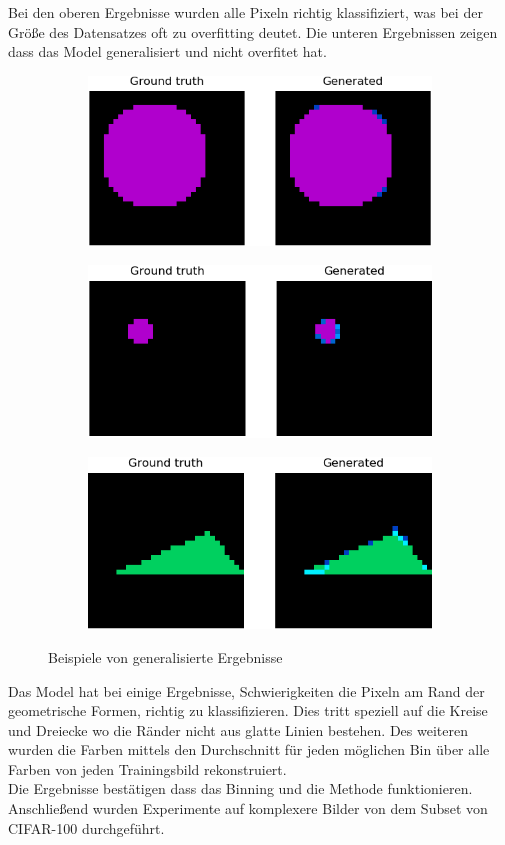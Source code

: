 Bei den oberen Ergebnisse wurden alle Pixeln richtig klassifiziert, was bei der Größe des Datensatzes oft zu overfitting deutet.
Die unteren Ergebnissen zeigen dass das Model generalisiert und nicht overfitet hat.

\begin{figure}[H]
  \vspace{1cm}
  \begin{subfigure}
    \centering
    \includegraphics[width=.32\textwidth]{resources/experiments/581.png}
  \end{subfigure}
  \begin{subfigure}
    \centering
    \includegraphics[width=.32\textwidth]{resources/experiments/712.png}
  \end{subfigure}
  \begin{subfigure}
    \centering
    \includegraphics[width=.32\textwidth]{resources/experiments/761.png}
  \end{subfigure}
  \caption{Beispiele von generalisierte Ergebnisse}
  \label{image:nicht-gute-ergebnisse-toy-dataset}
\end{figure}

Das Model hat bei einige Ergebnisse, Schwierigkeiten die Pixeln am Rand der geometrische Formen, richtig zu klassifizieren.
Dies tritt speziell auf die Kreise und Dreiecke wo die Ränder nicht aus glatte Linien bestehen. Des weiteren wurden die Farben mittels
den Durchschnitt für jeden möglichen Bin über alle Farben von jeden Trainingsbild rekonstruiert.
\\
Die Ergebnisse bestätigen dass das Binning und die Methode funktionieren. Anschließend wurden Experimente auf komplexere Bilder
von dem Subset von CIFAR-100 durchgeführt.

